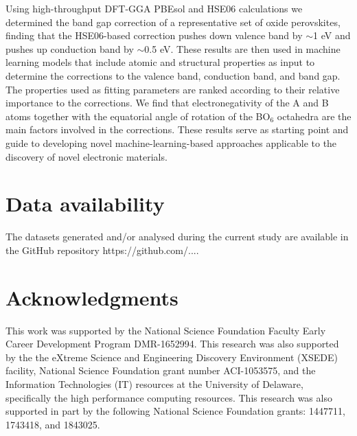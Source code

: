 \documentclass[%
reprint,
superscriptaddress,
citeautoscript,
 amsmath,amssymb,
 aps,
 prl,
floatfix,
]{revtex4-1}
\begin{document}
Using high-throughput DFT-GGA PBEsol and HSE06 calculations we determined the band gap correction of a representative set of oxide perovskites, finding that the HSE06-based correction pushes down valence band by $\sim$1 eV and pushes up conduction band by $\sim$0.5 eV. These results are then used in machine learning models that include atomic and structural properties as input to determine the corrections to the valence band, conduction band, and band gap. The properties used as fitting parameters are ranked according to their relative importance to the corrections. We find that electronegativity of the A and B atoms together with the equatorial angle of rotation of the BO$_6$ octahedra are the main factors involved in the corrections. These results serve as starting point and guide to developing novel machine-learning-based approaches applicable to the discovery of novel electronic materials.

\section{Data availability}

The datasets generated and/or analysed during the current study are available in
the GitHub repository https://github.com/....

\section{Acknowledgments}

This work was supported by the National Science Foundation Faculty Early Career Development Program DMR-1652994. This research was also supported by the the eXtreme Science and Engineering Discovery Environment (XSEDE) facility, National Science Foundation grant number ACI-1053575, and the Information Technologies (IT) resources at the University of Delaware, specifically the high performance computing resources. This research was also supported in part by the following National Science Foundation grants: 1447711, 1743418, and 1843025.


\end{document}
